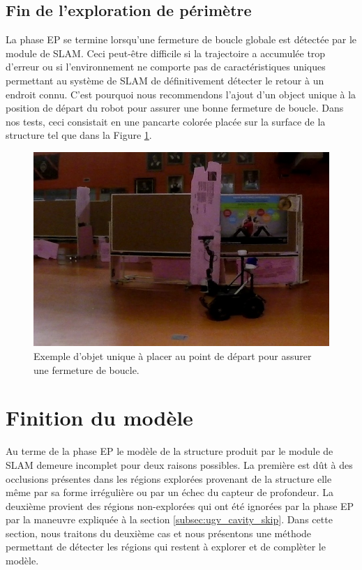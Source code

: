 \subsection{Fin de l'exploration de périmètre}

La phase EP se termine lorsqu'une fermeture de boucle globale est détectée par le module de SLAM. Ceci peut-être difficile si la trajectoire a accumulée trop d'erreur ou si l'environnement ne comporte pas de caractéristiques uniques permettant au système de SLAM de définitivement détecter le retour à un endroit connu. C'est pourquoi nous recommendons l'ajout d'un object unique à la position de départ du robot pour assurer une bonne fermeture de boucle. Dans nos tests, ceci consistait en une pancarte colorée placée sur la surface de la structure tel que dans la Figure \ref{fig:ugv_pancarte}.

\begin{figure}[ht]
  \centering
  \includegraphics[width=0.5\linewidth]{images/ugv_unique.jpg}
  \caption{Exemple d'objet unique à placer au point de départ pour assurer une fermeture de boucle.}
  \label{fig:ugv_pancarte}
\end{figure}

\section{Finition du modèle} \label{sec:cavity_exploration}

Au terme de la phase EP le modèle de la structure produit par le module de SLAM demeure incomplet pour deux raisons possibles. La première est dût à des occlusions présentes dans les régions explorées provenant de la structure elle même par sa forme irrégulière ou par un échec du capteur de profondeur. La deuxième provient des régions non-explorées qui ont été ignorées par la phase EP par la maneuvre expliquée à la section \ref{subsec:ugv_cavity_skip}. Dans cette section, nous traitons du deuxième cas et nous présentons une méthode permettant de détecter les régions qui restent à explorer et de complèter le modèle.

